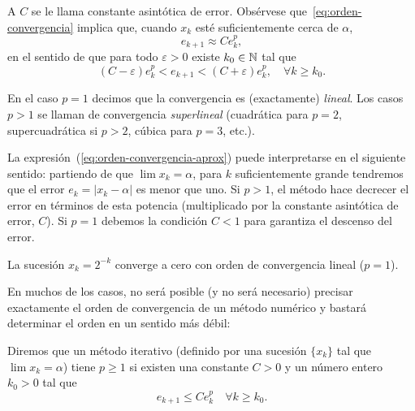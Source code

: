 A $C$ se le llama constante asintótica de error.
Obsérvese que~\eqref{eq:orden-convergencia} implica que, cuando $x_k$
esté suficientemente cerca de $\alpha$,
\begin{equation}
  \label{eq:orden-convergencia-aprox}
  e_{k+1} \approx C e_k^p,
\end{equation}
en el sentido de que para todo $\varepsilon>0$ existe $k_0\in\operatorname{{\mathbb N}}$ tal que
\begin{equation*}
  \label{eq:orden-convergencia-2}
  (C-\varepsilon) e_k^p < e_{k+1} <
  (C+\varepsilon)  e_k^p, \quad \forall k \ge k_0.
\end{equation*}

En el caso $p=1$ decimos que la convergencia es (exactamente)
\textit{lineal}. Los casos $p>1$ se llaman de convergencia
\textit{superlineal} (cuadrática para $p=2$, supercuadrática si $p>2$,
cúbica para $p=3$, etc.).


\begin{remark}
  \label{rk:interpretacion-orden-convergencia}
  La expresión~(\ref{eq:orden-convergencia-aprox}) puede interpretarse
  en el siguiente sentido: partiendo de que $\lim x_k=\alpha$, para
  $k$ suficientemente grande tendremos que el error $e_k=|x_k-\alpha|$ es
  menor que uno. Si $p>1$, el método hace decrecer el error en
  términos de esta potencia (multiplicado por la constante asintótica
  de error, $C$). Si $p=1$ debemos la condición $C<1$ para garantiza el
  descenso del error.\label{rk:1}
\end{remark}

\begin{example}
  \label{rk:2}
  La sucesión $x_k=2^{-k}$ converge a cero con orden de convergencia lineal ($p=1$).
\end{example}

En muchos de los casos, no será posible (y no será necesario)
precisar exactamente el orden de convergencia de un método numérico y
bastará determinar el orden en un sentido más débil:

\begin{definition}
  Diremos que un método iterativo (definido por una sucesión $\{x_k\}$ tal
  que $\lim x_k=\alpha$) tiene 
  $p\ge 1$ si existen una constante $C>0$ y un número entero $k_0>0$
  tal que
  \begin{equation}
    \label{eq:orden-convergencia-al-menos-p}
    e_{k+1} \le C e_k^p \quad \forall k\ge k_0.
  \end{equation}
  \label{def:orden-convergencia-al-menos-p}
\end{definition}

